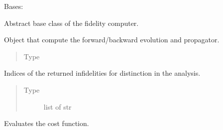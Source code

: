 \documentclass[letterpaper,10pt,english]{sphinxmanual}
\begin{document}
\begin{fulllineitems}
\label{\detokenize{qsim:qsim.cost_functions.CostFunction}}
Bases: 

Abstract base class of the fidelity computer.

\begin{fulllineitems}
\label{\detokenize{qsim:qsim.cost_functions.CostFunction.solver}}
Object that compute the forward/backward evolution and propagator.
\begin{quote}\begin{description}
\item[{Type}] \leavevmode
{}

\end{description}\end{quote}

\end{fulllineitems}


\begin{fulllineitems}
\label{\detokenize{qsim:qsim.cost_functions.CostFunction.index}}
Indices of the returned infidelities for distinction in the analysis.
\begin{quote}\begin{description}
\item[{Type}] \leavevmode
list of str

\end{description}\end{quote}

\end{fulllineitems}


\begin{fulllineitems}
\label{\detokenize{qsim:qsim.cost_functions.CostFunction.costs}}
Evaluates the cost function.


\end{fulllineitems}
\end{fulllineitems}
\end{document}

